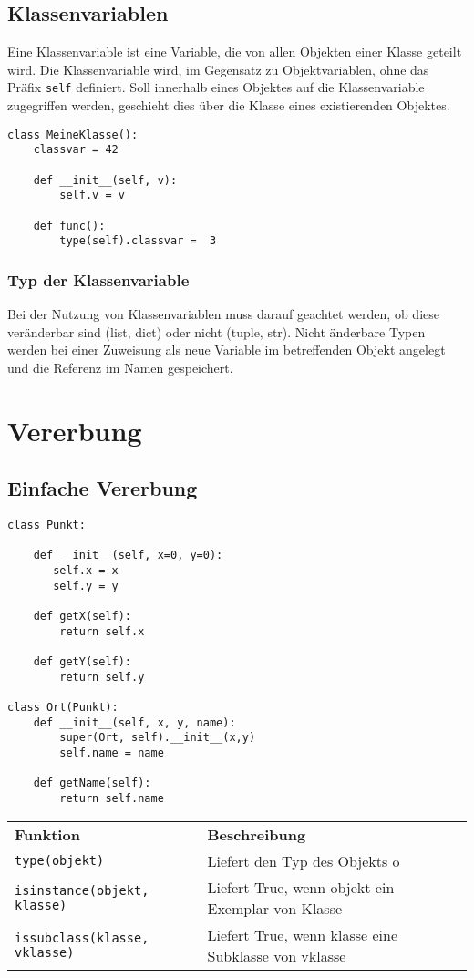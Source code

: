 \subsection{Klassenvariablen}
Eine Klassenvariable ist eine Variable, die von allen Objekten einer Klasse geteilt wird. Die Klassenvariable wird, im Gegensatz zu Objektvariablen, ohne das Präfix \texttt{self} definiert. Soll innerhalb eines Objektes auf die Klassenvariable zugegriffen werden, geschieht dies über die Klasse eines existierenden Objektes.
\begin{lstlisting}
class MeineKlasse():
    classvar = 42
    
    def __init__(self, v):
        self.v = v
        
    def func():
        type(self).classvar =  3   
\end{lstlisting}
\subsubsection{Typ der Klassenvariable}
Bei der Nutzung von Klassenvariablen muss darauf geachtet werden, ob diese veränderbar sind (list, dict) oder nicht (tuple, str). Nicht änderbare Typen werden bei einer Zuweisung als neue Variable im betreffenden Objekt angelegt und die Referenz im Namen gespeichert.
\section{Vererbung}
\subsection{Einfache Vererbung}
\begin{lstlisting}
class Punkt:
 
    def __init__(self, x=0, y=0):
       self.x = x
       self.y = y

    def getX(self):
        return self.x
   
    def getY(self):
        return self.y
        
class Ort(Punkt):
    def __init__(self, x, y, name):
        super(Ort, self).__init__(x,y)
        self.name = name
        
    def getName(self):
        return self.name
\end{lstlisting}
\begin{tabular}{ll}
\textbf{Funktion}		&\textbf{Beschreibung}\\
\texttt{type(objekt)}					&Liefert den Typ des Objekts o\\
\texttt{isinstance(objekt, klasse)}		&Liefert True, wenn objekt ein Exemplar von Klasse\\
\texttt{issubclass(klasse, vklasse)}		&Liefert True, wenn klasse eine Subklasse von vklasse\\
\end{tabular}
